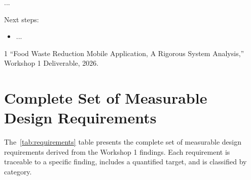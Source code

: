 \documentclass[conference]{IEEEtran}
\begin{document}
...

Next steps:
\begin{itemize}
    \item ...
\end{itemize}

\begin{thebibliography}{1}
 ``Food Waste Reduction Mobile Application, A Rigorous System Analysis,'' Workshop 1 Deliverable, 2026.
\end{thebibliography}

\appendix

\section{Complete Set of Measurable Design Requirements}
\label{app:requirements}

The~\ref{tab:requirements}  table presents the complete set of measurable design requirements derived from the Workshop 1 findings. Each requirement is traceable to a specific finding, includes a quantified target, and is classified by category.
\end{document}
